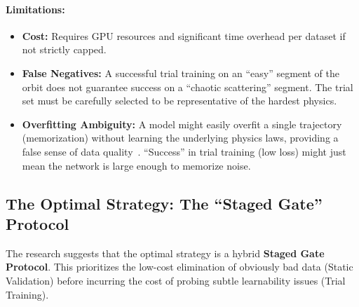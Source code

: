 \paragraph{Limitations:}
\begin{itemize}
    \item \textbf{Cost:} Requires GPU resources and significant time overhead per dataset if not strictly capped.
    \item \textbf{False Negatives:} A successful trial training on an ``easy'' segment of the orbit does not guarantee success on a ``chaotic scattering'' segment. The trial set must be carefully selected to be representative of the hardest physics.
    \item \textbf{Overfitting Ambiguity:} A model might easily overfit a single trajectory (memorization) without learning the underlying physics laws, providing a false sense of data quality~\cite{ref18}. ``Success'' in trial training (low loss) might just mean the network is large enough to memorize noise.
\end{itemize}

\subsection{The Optimal Strategy: The ``Staged Gate'' Protocol}

The research suggests that the optimal strategy is a hybrid \textbf{Staged Gate Protocol}. This prioritizes the low-cost elimination of obviously bad data (Static Validation) before incurring the cost of probing subtle learnability issues (Trial Training).


